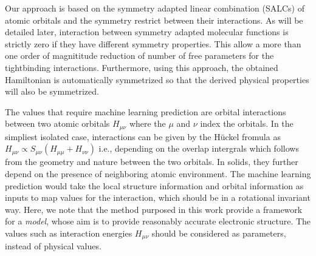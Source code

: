\documentclass{article}
\begin{document}
Our approach is based on the symmetry adapted linear combination (SALCs) of atomic 
orbitals and the symmetry restrict between their interactions. As will be detailed 
later, interaction between symmetry adapted molecular functions is strictly zero if
they have different symmetry properties. This allow a more than one order of magnititude reduction of 
number of free parameters for the tightbinding interactions. Furthermore, using this 
approach, the obtained Hamiltonian is automatically symmetrized so that the derived 
physical properties will also be symmetrized. 

The values that require machine learning prediction are orbital interactions between two 
atomic orbitals $H_{\mu\nu}$ where the $\mu$ and $\nu$ index the orbitals. 
In the simpliest isolated case, interactions can be given by the H\"uckel fromula as 
$H_{\mu\nu}\propto S_{\mu\nu}(H_{\mu\mu}+H_{\nu\nu})$ i.e., depending on the overlap intergrals
which follows from the geometry and nature between the two orbitals. In solids, they further 
depend on the presence of neighboring atomic environment. The machine learning prediction would 
take the local structure information and orbital information as inputs to map values for 
the interaction, which should be in a rotational invariant way. Here, we note that the 
method purposed in this work provide a framework for a \emph{model}, whose aim is to provide 
reasonably accurate electronic structure. The values such as interaction energies $H_{\mu\nu}$
should be considered as parameters, instead of physical values.
\end{document}
